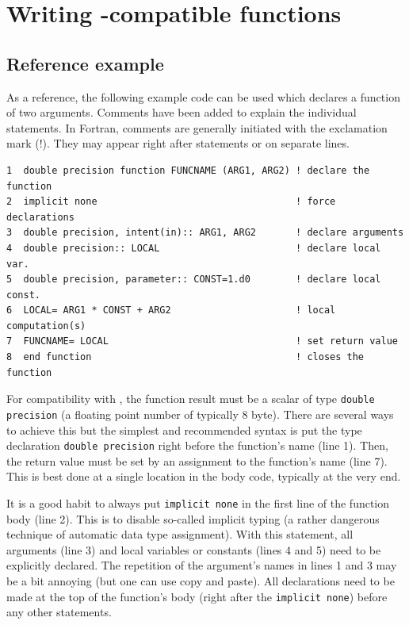 \documentclass[times,onecolumn]{article}
\begin{document}
\section{Writing -compatible  functions} \label{sec:fortranFunctions}

\subsection{Reference example}

As a reference, the following example code can be used which declares a function of two arguments. Comments have been added to explain the individual statements. In Fortran, comments are generally initiated with the exclamation mark (!). They may appear right after statements or on separate lines.

\begin{shaded}
\begin{small}
\begin{verbatim}
1  double precision function FUNCNAME (ARG1, ARG2) ! declare the function
2  implicit none                                   ! force declarations
3  double precision, intent(in):: ARG1, ARG2       ! declare arguments
4  double precision:: LOCAL                        ! declare local var.
5  double precision, parameter:: CONST=1.d0        ! declare local const.
6  LOCAL= ARG1 * CONST + ARG2                      ! local computation(s)
7  FUNCNAME= LOCAL                                 ! set return value
8  end function                                    ! closes the function
\end{verbatim}
\end{small}
\end{shaded}

For compatibility with , the function result must be a scalar of type \verb|double precision| (a floating point number of typically 8 byte). There are several ways to achieve this but the simplest and recommended syntax is put the type declaration \verb|double precision| right before the function's name (line 1). Then, the return value must be set by an assignment to the function's name (line 7). This is best done at a single location in the body code, typically at the very end.

It is a good habit to always put \verb|implicit none| in the first line of the function body (line 2). This is to disable so-called implicit typing (a rather dangerous technique of automatic data type assignment). With this statement, all arguments (line 3) and local variables or constants (lines 4 and 5) need to be explicitly declared. The repetition of the argument's names in lines 1 and 3 may be a bit annoying (but one can use copy and paste). All declarations need to be made at the top of the function's body (right after the \verb|implicit none|) before any other statements.
\end{document}
